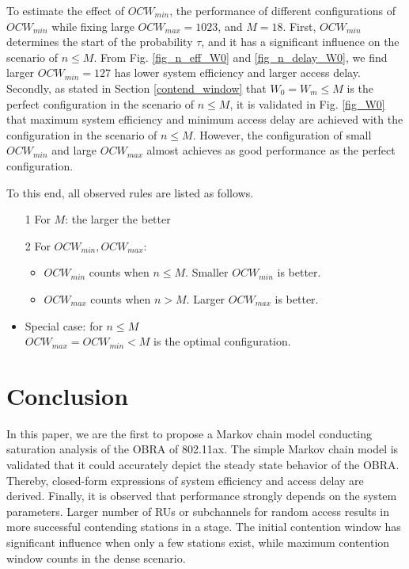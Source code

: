 \documentclass[journal]{IEEEtran}
\begin{document}
To estimate the effect of $OCW_{min}$, the performance of different configurations of $OCW_{min}$ while fixing large $OCW_{max}=1023$, and $M=18$. 
First, $OCW_{min}$ determines the start of the probability $\tau$, and it has a significant influence on the scenario of $n\leq M$.
From Fig. \ref{fig_n_eff_W0} and \ref{fig_n_delay_W0}, we find larger $OCW_{min}=127$ has lower system efficiency and larger access delay. 
Secondly, as stated in Section \ref{contend_window} that $W_0=W_m\leq M$ is the perfect configuration in the scenario of $n\leq M$, it is validated in Fig. \ref{fig_W0} that maximum system efficiency and minimum access delay are achieved with the configuration in the scenario of $n\leq M$.
However, the configuration of small $OCW_{min}$ and large $OCW_{max}$ almost achieves as good performance as the perfect configuration.  

To this end, all observed rules are listed as follows.
 
\begin{itemize}
\item[1] For $M$: the larger the better
\item[2] For $OCW_{min}, OCW_{max}$:
	\begin{itemize}
	\item $OCW_{min}$ counts when $n\leq M$. Smaller $OCW_{min}$ is better.
	\item $OCW_{max}$ counts when $n>M$. Larger $OCW_{max}$ is better.
	\end{itemize}
\end{itemize}
\begin{itemize}
	\item Special case: for $n\leq M$\\
	$OCW_{max}=OCW_{min}<M$ is the optimal configuration.  
\end{itemize}





\section{Conclusion}   \label{sec_conclu}
In this paper, we are the first to propose a Markov chain model conducting saturation analysis of the OBRA of 802.11ax.
The simple Markov chain model is validated that it could accurately depict the steady state behavior of the OBRA.
Thereby, closed-form expressions of system efficiency and access delay are derived. 
Finally, it is observed that performance strongly depends on the system parameters. 
Larger number of RUs or subchannels for random access results in more successful contending stations in a stage.
The initial contention window has significant influence when only a few stations exist, while maximum contention window counts in the dense scenario.
\end{document}
